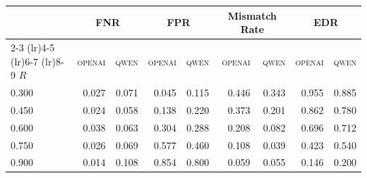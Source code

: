 \begin{tabular}{lrrrrrrrr}
\toprule
  & \multicolumn{2}{c}{FNR} & \multicolumn{2}{c}{FPR} & \multicolumn{2}{c}{Mismatch Rate} & \multicolumn{2}{c}{EDR} \\
  \cmidrule(lr){2-3} \cmidrule(lr){4-5} \cmidrule(lr){6-7} \cmidrule(lr){8-9}
$R$ & \textsc{openai} & \textsc{qwen} & \textsc{openai} & \textsc{qwen} & \textsc{openai} & \textsc{qwen} & \textsc{openai} & \textsc{qwen} \\
\midrule
0.300 & 0.027 & 0.071 & 0.045 & 0.115 & 0.446 & 0.343 & 0.955 & 0.885 \\
0.450 & 0.024 & 0.058 & 0.138 & 0.220 & 0.373 & 0.201 & 0.862 & 0.780 \\
0.600 & 0.038 & 0.063 & 0.304 & 0.288 & 0.208 & 0.082 & 0.696 & 0.712 \\
0.750 & 0.026 & 0.069 & 0.577 & 0.460 & 0.108 & 0.039 & 0.423 & 0.540 \\
0.900 & 0.014 & 0.108 & 0.854 & 0.800 & 0.059 & 0.055 & 0.146 & 0.200 \\
\bottomrule
\end{tabular}
